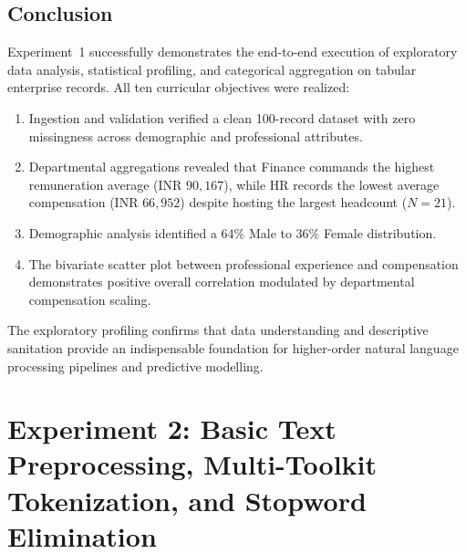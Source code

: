 \documentclass[12pt,a4paper]{report}
\begin{document}
\section{Conclusion}
Experiment~1 successfully demonstrates the end-to-end execution of exploratory data analysis, statistical profiling, and categorical aggregation on tabular enterprise records. All ten curricular objectives were realized:
\begin{enumerate}
    \item Ingestion and validation verified a clean 100-record dataset with zero missingness across demographic and professional attributes.
    \item Departmental aggregations revealed that Finance commands the highest remuneration average ($\text{INR } 90,167$), while HR records the lowest average compensation ($\text{INR } 66,952$) despite hosting the largest headcount ($N = 21$).
    \item Demographic analysis identified a 64\% Male to 36\% Female distribution.
    \item The bivariate scatter plot between professional experience and compensation demonstrates positive overall correlation modulated by departmental compensation scaling.
\end{enumerate}
The exploratory profiling confirms that data understanding and descriptive sanitation provide an indispensable foundation for higher-order natural language processing pipelines and predictive modelling.



\chapter{Experiment 2: Basic Text Preprocessing, Multi-Toolkit Tokenization, and Stopword Elimination}
\label{chap:exp2}
\end{document}
